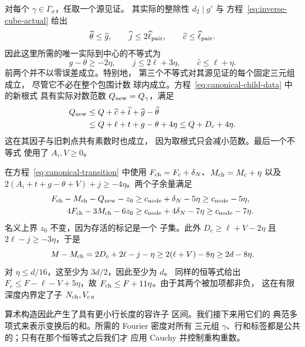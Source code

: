 对每个 \(\gamma\in\Gamma_\sigma\)，任取一个源见证。
其实际的整除性 \(d_2\mid g'\) 与
方程~\eqref{eq:inverse-cube-actual} 给出
\[
 \widehat\theta\le\widehat g,\qquad
 \widehat j\le2\widehat\ell_{\rm pair},\qquad
 \widehat c\le\widehat\ell_{\rm pair}.
\]
因此这里所需的唯一实际到中心的不等式为
\begin{equation}\label{eq:inverse-center-inequalities}
 g-\theta\ge-2\eta,\qquad j\le2\ell+3\eta,\qquad
 \widehat c\le\ell+\eta.
\end{equation}
前两个并不以零误差成立。特别地，
第三个不等式对其源见证的每个固定三元组成立，
尽管它不必在整个包围计数
球内成立。方程~\eqref{eq:canonical-child-data} 中的新根式
具有实际对数范数 \(Q_{\rm new}=Q_\gamma\)，满足
\begin{equation}\label{eq:inverse-new-puncture}
 \begin{split}
 Q_{\rm new}&\le Q+\widehat c+\widehat t+\widehat g-\widehat\theta\\
 &\le Q+\ell+t+g-\theta+4\eta\le Q+D_c+4\eta.
 \end{split}
\end{equation}
这在其因子与旧刺点共有素数时也成立，
因为取根式只会减小范数。最后一个不等式
使用了 \(A_i,V\ge0\)。

在方程~\eqref{eq:canonical-transition} 中使用 \(F_{\rm ch}=F_c+\delta_N\)、\(M_{\rm ch}=M_c+\eta\) 以及
\(2(A_i+t+g-\theta+V)+j\ge-4\eta\)。两个子余量满足
\begin{equation}\label{eq:inverse-child-margins}
 \begin{aligned}
 F_{\rm ch}-M_{\rm ch}-Q_{\rm new}-z_0
   &\ge c_{\rm node}+\delta_N-5\eta\ge c_{\rm node}-5\eta,\\
 4F_{\rm ch}-3M_{\rm ch}-6z_0
   &\ge c_{\rm node}+4\delta_N-7\eta\ge c_{\rm node}-7\eta.
 \end{aligned}
\end{equation}
名义上界 \(z_0\) 不变，因为存活的标记是一个
子集。此外 \(D_c\ge\ell+V-2\eta\) 且
\(2\ell-j\ge-3\eta\)，于是
\begin{equation}\label{eq:inverse-row-decrease}
 M-M_{\rm ch}=2D_c+2\ell-j-\eta
       \ge2(\ell+V)-8\eta\ge2d-8\eta.
\end{equation}
对 \(\eta\le d/16\)，这至少为 \(3d/2\)，因此至少为 \(d\)。
同样的恒等式给出 \(F_c\le F-\ell-V+5\eta\)，故
\(F_{\rm ch}\le F+11\eta\)。由于其两个被加项都非负，
这在有限深度内界定了子 \(N_{\rm ch},V_c\)。

算术构造因此产生了具有更小行长度的容许子
区间。我们接下来用它们的
典范多项式来表示变换后的和。所需的 Fourier 密度对所有
三元组 \(\gamma\)、行和标签都是公共的；只有在那个恒等式之后我们才
应用 Cauchy 并控制重构重数。

